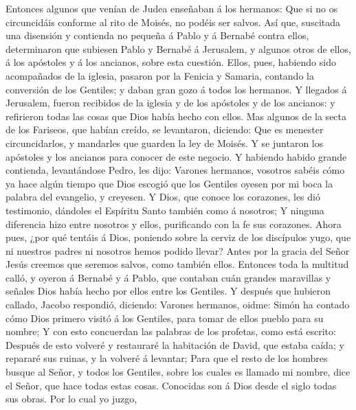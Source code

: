  Entonces algunos que venían de Judea enseñaban á los
hermanos: Que si no os circuncidáis conforme al rito de Moisés, no
podéis ser salvos.  Así que, suscitada una disensión y
contienda no pequeña á Pablo y á Bernabé contra ellos, determinaron que
subiesen Pablo y Bernabé á Jerusalem, y algunos otros de ellos, á los
apóstoles y á los ancianos, sobre esta cuestión.  Ellos,
pues, habiendo sido acompañados de la iglesia, pasaron por la Fenicia y
Samaria, contando la conversión de los Gentiles; y daban gran gozo á
todos los hermanos.  Y llegados á Jerusalem, fueron
recibidos de la iglesia y de los apóstoles y de los ancianos: y
refirieron todas las cosas que Dios había hecho con ellos.
 Mas algunos de la secta de los Fariseos, que habían
creído, se levantaron, diciendo: Que es menester circuncidarlos, y
mandarles que guarden la ley de Moisés.  Y se juntaron los
apóstoles y los ancianos para conocer de este negocio.  Y
habiendo habido grande contienda, levantándose Pedro, les dijo: Varones
hermanos, vosotros sabéis cómo ya hace algún tiempo que Dios escogió que
los Gentiles oyesen por mi boca la palabra del evangelio, y creyesen.
 Y Dios, que conoce los corazones, les dió testimonio,
dándoles el Espíritu Santo también como á nosotros;  Y
ninguna diferencia hizo entre nosotros y ellos, purificando con la fe
sus corazones.  Ahora pues, ¿por qué tentáis á Dios,
poniendo sobre la cerviz de los discípulos yugo, que ni nuestros padres
ni nosotros hemos podido llevar?  Antes por la gracia del
Señor Jesús creemos que seremos salvos, como también ellos.
 Entonces toda la multitud calló, y oyeron á Bernabé y á
Pablo, que contaban cuán grandes maravillas y señales Dios había hecho
por ellos entre los Gentiles.  Y después que hubieron
callado, Jacobo respondió, diciendo: Varones hermanos, oidme:
 Simón ha contado cómo Dios primero visitó á los
Gentiles, para tomar de ellos pueblo para su nombre;  Y
con esto concuerdan las palabras de los profetas, como está escrito:
 Después de esto volveré y restauraré la habitación de
David, que estaba caída; y repararé sus ruinas, y la volveré á levantar;
 Para que el resto de los hombres busque al Señor, y
todos los Gentiles, sobre los cuales es llamado mi nombre, dice el
Señor, que hace todas estas cosas.  Conocidas son á Dios
desde el siglo todas sus obras.  Por lo cual yo juzgo,
